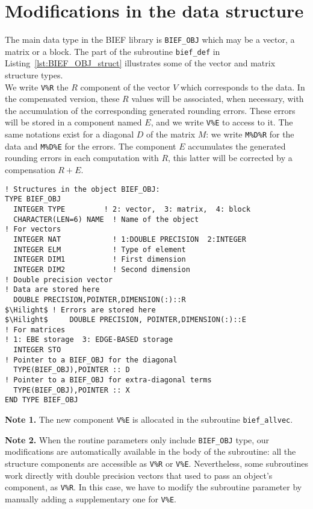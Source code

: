 \section{Modifications in the data structure }
\label{sec:imple_data}
%
The main data type in the BIEF library is
\texttt{BIEF\_OBJ} which may be a vector, a matrix or a block.
The part of the subroutine \texttt{bief\_def} in Listing~\ref{lst:BIEF_OBJ_struct}
illustrates some of the vector and matrix structure types.\\
%
We write \texttt{V\%R} the $R$ component of the vector $V$
which corresponds to the data.
In the compensated version, these $R$ values will be associated,
when necessary, with the accumulation of the corresponding generated rounding errors.
These errors will be stored in a component named $E$, and
we write \texttt{V\%E} to access to it.
The same notations exist for a diagonal $D$ of the matrix $M$:
we write \texttt{M\%D\%R} for the data and \texttt{M\%D\%E} for the errors.
The component $E$ accumulates the generated rounding errors in each computation with
$R$, this latter will be corrected by a compensation $R+E$.
%
\begin{lstlisting}[language=TelFortran,caption={The BIEF\_OBJ structure in \texttt{bief\_def}},label={lst:BIEF_OBJ_struct},escapechar=\$]
! Structures in the object BIEF_OBJ:
TYPE BIEF_OBJ
  INTEGER TYPE         ! 2: vector,  3: matrix,  4: block
  CHARACTER(LEN=6) NAME  ! Name of the object
! For vectors
  INTEGER NAT            ! 1:DOUBLE PRECISION  2:INTEGER
  INTEGER ELM            ! Type of element
  INTEGER DIM1           ! First dimension
  INTEGER DIM2           ! Second dimension
! Double precision vector
! Data are stored here
  DOUBLE PRECISION,POINTER,DIMENSION(:)::R
$\Hilight$ ! Errors are stored here
$\Hilight$     DOUBLE PRECISION, POINTER,DIMENSION(:)::E
! For matrices
! 1: EBE storage  3: EDGE-BASED storage
  INTEGER STO
! Pointer to a BIEF_OBJ for the diagonal
  TYPE(BIEF_OBJ),POINTER :: D
! Pointer to a BIEF_OBJ for extra-diagonal terms
  TYPE(BIEF_OBJ),POINTER :: X
END TYPE BIEF_OBJ
\end{lstlisting}
%
%
\begin{description}
\item \textbf{Note 1.} The new component \texttt{V\%E} is allocated in the
subroutine \texttt{bief\_allvec}.
%
\item \textbf{Note 2.} When the routine parameters only include \texttt{BIEF\_OBJ} type,
our modifications are automatically available in the body of the subroutine:
all the structure components are accessible as \texttt{V\%R} or \texttt{V\%E}.
Nevertheless, some subroutines work directly with double precision vectors that
used to pass an object's component, as \texttt{V\%R}.
In this case, we have to modify the subroutine parameter by manually
adding a supplementary one for \texttt{V\%E}.
\end{description}
%
